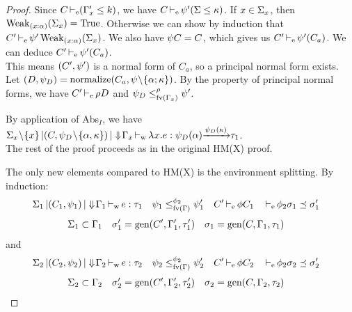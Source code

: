 \begin{proof}
  Since $C \operatorname{\vdash_e} (\Gamma'_x \leq k)$, we have $C \operatorname{\vdash_e} \mathrm{\psi}'(\Sigma \leq \kappa)$.
  If $x\in\Sigma_x$, then $\operatorname{Weak}_{(x : \alpha)}(\Sigma_x) = \operatorname{True}$.
  Otherwise we can show by induction
  that $C' \operatorname{\vdash_e} \mathrm{\psi}'\operatorname{Weak}_{(x : \alpha)}(\Sigma_x)$.
  We also have $\mathrm{\psi} C = C$, which gives us $C' \operatorname{\vdash_e} \mathrm{\psi}'(C_a)$.
  We can deduce
  $C' \operatorname{\vdash_e} \mathrm{\psi}'(C_a)$.\\
  This means $(C',\mathrm{\psi}')$ is a normal form of $C_a$, so a principal normal form
  exists. Let $(D,\mathrm{\psi}_D) = \operatorname{normalize}(C_a,\mathrm{\psi}\!\setminus\!\{\alpha;\kappa\})$.
  By the property of principal normal forms,
  we have $C' \operatorname{\vdash_e} \rho D$ and
  $\mathrm{\psi}_D \leq^{\rho}_{\operatorname{fv}(\Gamma_x)} \mathrm{\psi}'$.

  By application of {\sc Abs$_I$}, we have
  $\Sigma_x\!\setminus\!\{x\} \operatorname{|} (C,\mathrm{\psi}_D\!\setminus\!\{\alpha,\kappa\}) \operatorname{|} \Downarrow\!\Gamma_x \operatorname{\vdash_w} \lambda^{{}} x.{e} : \mathrm{\psi}_D(\alpha){\xrightarrow{\mathrm{\psi}_D(\kappa)}}\tau_1$.\\
  The rest of the proof proceeds as in the original HM(X) proof.
  \\



  The only new elements compared to HM(X) is
  the environment splitting.
  By induction:
  \begin{align*}
    \Sigma_1 \operatorname{|} (C_1,\mathrm{\psi}_1) \operatorname{|} \Downarrow\!\Gamma_1& \operatorname{\vdash_w} e : \tau_1
    &\mathrm{\psi}_1 &\leq^{\phi_2}_{\operatorname{fv}(\Gamma)} \mathrm{\psi}'_1
    &C'& \operatorname{\vdash_e} \phi C_1
    && \operatorname{\vdash_e} \phi_2 \sigma_1 \preceq \sigma'_1
  \end{align*}
  \begin{align*}
    \Sigma_1&\subset\Gamma_1
    &\sigma'_1 &= \operatorname{\text{gen}}(C',\Gamma'_1,\tau'_1)
    &\sigma_1 &= \operatorname{\text{gen}}(C,\Gamma_1,\tau_1)
  \end{align*}
  and
  \begin{align*}
    \Sigma_2 \operatorname{|} (C_2,\mathrm{\psi}_2) \operatorname{|} \Downarrow\!\Gamma_2& \operatorname{\vdash_w} e : \tau_2
    &\mathrm{\psi}_2 &\leq^{\phi_2}_{\operatorname{fv}(\Gamma)} \mathrm{\psi}'_2
    &C'& \operatorname{\vdash_e} \phi C_2
    && \operatorname{\vdash_e} \phi_2 \sigma_2 \preceq \sigma'_2
  \end{align*}
  \begin{align*}
    \Sigma_2&\subset\Gamma_2
    &\sigma'_2 &= \operatorname{\text{gen}}(C',\Gamma'_2,\tau'_2)
    &\sigma_2 &= \operatorname{\text{gen}}(C,\Gamma_2,\tau_2)
  \end{align*}



\end{proof}
